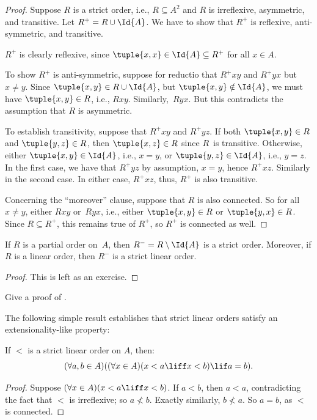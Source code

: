 \documentclass[../../../include/open-logic-section]{subfiles}
\begin{document}
\begin{proof}
Suppose $R$ is a strict order, i.e., $R \subseteq A^2$ and $R$ is
irreflexive, asymmetric, and transitive. Let $R^+ = R \cup \Id{A}$. We
have to show that $R^+$ is reflexive, anti-symmetric, and transitive.

$R^+$ is clearly reflexive, since $\tuple{x, x} \in \Id{A} \subseteq
R^+$ for all $x \in A$. 

To show $R^+$ is anti-symmetric, suppose for reductio that $R^+xy$ and
$R^+yx$ but $x \neq y$. Since $\tuple{x,y} \in R \cup \Id{A}$, but
$\tuple{x, y} \notin \Id{A}$, we must have $\tuple{x, y} \in R$, i.e.,
$Rxy$. Similarly,~$Ryx$. But this contradicts the assumption
that $R$ is asymmetric.

To establish transitivity, suppose that $R^+xy$ and $R^+yz$. If both
$\tuple{x, y} \in R$ and $\tuple{y,z} \in R$, then $\tuple{x, z} \in
R$ since $R$~is transitive. Otherwise, either $\tuple{x, y} \in
\Id{A}$, i.e., $x = y$, or $\tuple{y, z} \in \Id{A}$, i.e., $y = z$.
In the first case, we have that $R^+yz$ by assumption, $x = y$, hence
$R^+xz$. Similarly in the second case. In either case, $R^+xz$, thus,
$R^+$ is also transitive.

Concerning the ``moreover'' clause, suppose that $R$ is also connected. 
So for all $x \neq y$, either $Rxy$ or~$Ryx$, i.e., either 
$\tuple{x, y} \in R$ or $\tuple{y, x} \in R$. Since $R \subseteq R^+$, 
this remains true of $R^+$, so $R^+$ is connected as well.
\end{proof}

\begin{prop}
If $R$ is a partial order on~$A$, then $R^- = R \setminus \Id{A}$ is a
strict order. Moreover, if $R$ is a linear order, then $R^-$ is a strict 
linear order.
\end{prop}

\begin{proof}
This is left as an exercise.
\end{proof}

\begin{prob}
Give a proof of . 
\end{prob}

The following simple result establishes that strict linear orders
satisfy an extensionality-like property:

\begin{prop}
If $<$ is a strict linear order on $A$, then:
\[
  (\forall a, b \in A)((\forall x \in A)(x < a \liff x < b) \lif a = b).
\]
\end{prop}

\begin{proof}
Suppose $(\forall x \in A)(x < a \liff x < b)$. If $a < b$, then $a <
a$, contradicting the fact that $<$ is irreflexive; so $a \nless b$.
Exactly similarly, $b \nless a$. So $a = b$, as $<$ is connected.
\end{proof}
\end{document}
